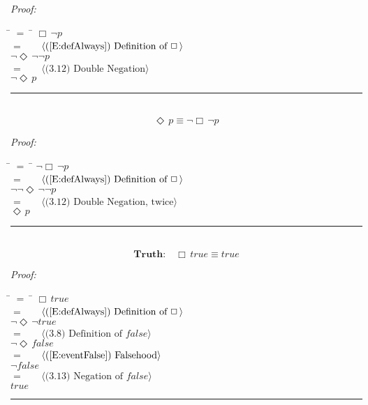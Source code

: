 \documentclass[fleqn, leqno]{article}
\newcommand{\lgap}{2pt}                             %
\newcommand{\mymathindent}{24pt}                    %
\newcommand{\Event}{\Diamond\,}
\newcommand{\Always}{\Box\,}
\newcommand{\myqed}{\hfill\rule[-.23ex]{1.2ex}{2.0ex}}
\newcommand{\Gll} {\langle}                         %
\newcommand{\Ggg} {\rangle}                         %
\newcommand{\Hint}[1]     {\ \ \ $\Gll              \mbox{#1} \Ggg$ }   %
\begin{document}
\emph{Proof:}
\begin{tabbing}
\hspace{\mymathindent} \= $= \;$ \= \kill
  \> \>   $\Always\lnot p$\\[\lgap]
  \> $=$  \>  \Hint{(\ref{E:defAlways}) Definition of $\Always$}\\[\lgap]
  \> \>   $\lnot\Event\lnot\lnot p$\\[\lgap]
  \> $=$  \>  \Hint{(3.12) Double Negation}\\[\lgap]
  \> \>   $\lnot\Event p$\\[\lgap]
\end{tabbing}
\myqed\\[\lgap]


\begin{equation}\label{E:eventAsAlways}
\Event p \equiv \lnot\Always\lnot p
\end{equation}

\emph{Proof:}
\begin{tabbing}
\hspace{\mymathindent} \= $= \;$ \= \kill
  \> \>   $\lnot\Always\lnot p$\\[\lgap]
  \> $=$  \>  \Hint{(\ref{E:defAlways}) Definition of $\Always$}\\[\lgap]
  \> \>   $\lnot\lnot\Event\lnot\lnot p$\\[\lgap]
  \> $=$  \>  \Hint{(3.12) Double Negation, twice}\\[\lgap]
  \> \>   $\Event p$\\[\lgap]
\end{tabbing}
\myqed\\[\lgap]


\begin{equation}\label{E:alwaysTrue}
\textbf{Truth:}\quad \Always true \equiv true
\end{equation}

\emph{Proof:}
\begin{tabbing}
\hspace{\mymathindent} \= $= \;$ \= \kill
  \> \>   $\Always true$\\[\lgap]
  \> $=$  \>  \Hint{(\ref{E:defAlways}) Definition of $\Always$}\\[\lgap]
  \> \>   $\lnot\Event\lnot true$\\[\lgap]
  \> $=$  \>  \Hint{(3.8) Definition of $false$}\\[\lgap]
  \> \>   $\lnot\Event false$\\[\lgap]
  \> $=$  \>  \Hint{(\ref{E:eventFalse}) Falsehood}\\[\lgap]
  \> \>   $\lnot false$\\[\lgap]
  \> $=$  \>  \Hint{(3.13) Negation of $false$}\\[\lgap]
  \> \>   $true$\\[\lgap]
\end{tabbing}
\myqed\\[\lgap]
\end{document}
